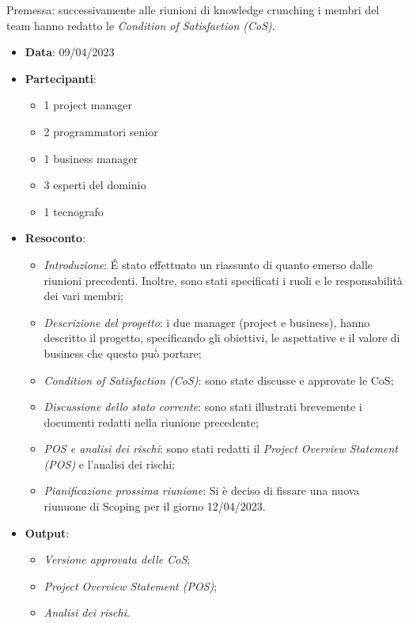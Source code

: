 \documentclass{article}
\begin{document}
  Premessa: successivamente alle riunioni di knowledge crunching i membri del team hanno redatto le
   \emph{Condition of Satisfaction (CoS)}.

  \begin{itemize}
    \item \textbf{Data}: 09/04/2023
    \item \textbf{Partecipanti}:
    \begin{itemize}
      \item 1 project manager
      \item 2 programmatori senior
      \item 1 business manager
      \item 3 esperti del dominio
      \item 1 tecnografo
    \end{itemize}
    \item \textbf{Resoconto}:
    \begin{itemize}
      \item \emph{Introduzione}: É stato effettuato un riassunto di quanto emerso dalle riunioni precedenti. 
      Inoltre, sono stati specificati i ruoli e le responsabilità dei vari membri;
      \item \emph{Descrizione del progetto}: i due manager (project e business), hanno descritto il progetto, 
        specificando gli obiettivi, le aspettative e il valore di business che questo può portare;
      \item \emph{Condition of Satisfaction (CoS)}: sono state discusse e approvate le CoS;
      \item \emph{Discussione dello stato corrente}: sono stati illustrati brevemente i documenti redatti 
        nella riunione precedente;
      \item \emph{POS e analisi dei rischi}: sono stati redatti il \emph{Project Overview Statement (POS)} 
        e l'analisi dei rischi;
      \item \emph{Pianificazione prossima riunione}:
        Si è deciso di fissare una nuova riunuone di Scoping per il giorno 12/04/2023.
    \end{itemize}
    \item \textbf{Output}:
    \begin{itemize}
      \item \emph{Versione approvata delle CoS};
      \item \emph{Project Overview Statement (POS)};
      \item \emph{Analisi dei rischi}.
    \end{itemize}
  \end{itemize}
\end{document}
